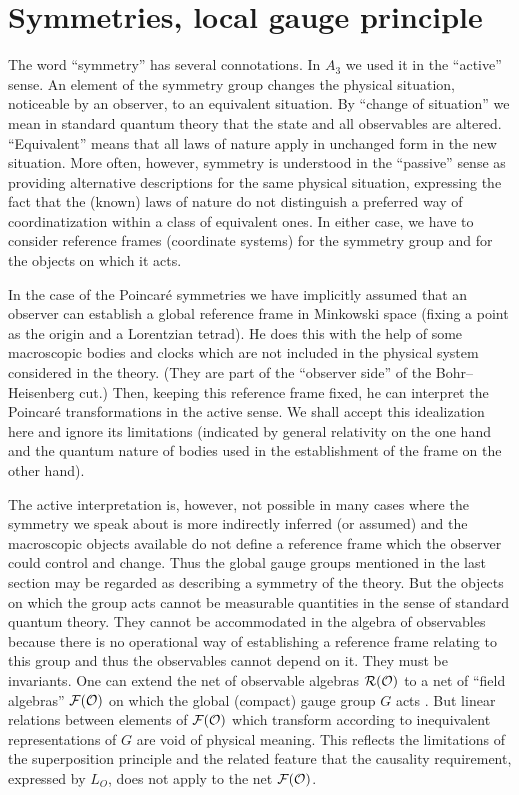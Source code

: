 \section{Symmetries, local gauge principle}
\setcounter{equation}{0}
The word ``symmetry'' has several connotations. In $A_3$ we used
it in the ``active'' sense. An element of the symmetry group changes
the physical situation, noticeable by an observer, to an equivalent 
situation. By ``change of situation'' we mean in standard quantum
theory that the state and all observables are
altered. ``Equivalent''  means that all laws of nature apply in
unchanged form in the new situation. More often, however, symmetry is
understood in the ``passive'' sense as providing alternative
descriptions for the same physical situation, expressing the fact that
the (known) laws of nature do not distinguish a preferred way of
coordinatization within a class of equivalent ones. In either case, we
have to consider reference frames (coordinate systems) 
for the symmetry group and for the
objects on which it acts. 

In the case of the Poincar\'e symmetries we have implicitly assumed
that an observer can establish a global reference frame in Minkowski
space (fixing a point as the origin and a Lorentzian tetrad). He
does this with the help of some macroscopic bodies and clocks which
are not included in the physical system considered in the
theory. (They are part of the ``observer side'' of the
Bohr--Heisenberg cut.) Then, keeping this reference frame fixed, he
can interpret the Poincar\'e transformations in the active sense. We
shall accept this idealization here and ignore its limitations
(indicated by general relativity on the one hand and the quantum
nature of bodies used in the establishment of the frame on the other
hand). 

The active interpretation is, however, not possible 
in many cases where the symmetry we speak about is more indirectly
inferred (or assumed) and the macroscopic objects available do not define
a reference frame which the observer could control and
change. Thus the global gauge groups mentioned in the last section may
be regarded as describing a symmetry of the theory. But the objects
on which the group acts cannot be measurable quantities in the sense  
of standard quantum theory. They cannot be accommodated in the algebra
of observables because there is no operational way of establishing
a reference frame relating to this group and thus the observables 
cannot depend on it. They must be invariants. One can extend the 
net of observable algebras ${\cal R}({\cal O})$ to a net of ``field algebras'' ${\cal F}({\cal O})$
on which the global (compact) gauge group $G$ acts \cite{DoRo}. 
But linear relations between elements of ${\cal F}({\cal O})$ which transform 
according to inequivalent representations of $G$ are void of 
physical meaning. This reflects the limitations of the superposition 
principle \cite{WiWiWi} and the related feature that the causality 
requirement, expressed by $L_O$, does not apply to the net ${\cal F}({\cal O})$.


